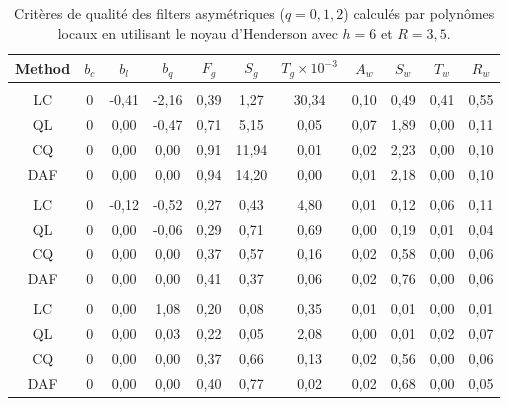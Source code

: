\documentclass[
  12pt,
  french,
  12pt,a4paper]{article}
\newcommand\1{\mathds{1}}
\begin{document}
\begin{table}[!h]

\caption{\label{tab:criteriaLp}Critères de qualité des filters asymétriques ($q=0,1,2$) calculés par polynômes locaux en utilisant le noyau d'Henderson avec $h=6$ et $R=3,5$.}
\centering
\begin{tabular}[t]{ccccccccccc}
\toprule
Method & $b_c$ & $b_l$ & $b_q$ & $F_g$ & $S_g$ & $T_g \times 10^{-3}$ & $A_w$ & $S_w$ & $T_w$ & $R_w$\\
\midrule
\addlinespace[0.3em]
\multicolumn{11}{l}{\textbf{$q=0$}}\\
\hspace{1em}LC & 0 & -0,41 & -2,16 & 0,39 & 1,27 & 30,34 & 0,10 & 0,49 & 0,41 & 0,55\\
\hspace{1em}QL & 0 & 0,00 & -0,47 & 0,71 & 5,15 & 0,05 & 0,07 & 1,89 & 0,00 & 0,11\\
\hspace{1em}CQ & 0 & 0,00 & 0,00 & 0,91 & 11,94 & 0,01 & 0,02 & 2,23 & 0,00 & 0,10\\
\hspace{1em}DAF & 0 & 0,00 & 0,00 & 0,94 & 14,20 & 0,00 & 0,01 & 2,18 & 0,00 & 0,10\\
\addlinespace[0.3em]
\multicolumn{11}{l}{\textbf{$q=1$}}\\
\hspace{1em}LC & 0 & -0,12 & -0,52 & 0,27 & 0,43 & 4,80 & 0,01 & 0,12 & 0,06 & 0,11\\
\hspace{1em}QL & 0 & 0,00 & -0,06 & 0,29 & 0,71 & 0,69 & 0,00 & 0,19 & 0,01 & 0,04\\
\hspace{1em}CQ & 0 & 0,00 & 0,00 & 0,37 & 0,57 & 0,16 & 0,02 & 0,58 & 0,00 & 0,06\\
\hspace{1em}DAF & 0 & 0,00 & 0,00 & 0,41 & 0,37 & 0,06 & 0,02 & 0,76 & 0,00 & 0,06\\
\addlinespace[0.3em]
\multicolumn{11}{l}{\textbf{$q=2$}}\\
\hspace{1em}LC & 0 & 0,00 & 1,08 & 0,20 & 0,08 & 0,35 & 0,01 & 0,01 & 0,00 & 0,01\\
\hspace{1em}QL & 0 & 0,00 & 0,03 & 0,22 & 0,05 & 2,08 & 0,00 & 0,01 & 0,02 & 0,07\\
\hspace{1em}CQ & 0 & 0,00 & 0,00 & 0,37 & 0,66 & 0,13 & 0,02 & 0,56 & 0,00 & 0,06\\
\hspace{1em}DAF & 0 & 0,00 & 0,00 & 0,40 & 0,77 & 0,02 & 0,02 & 0,68 & 0,00 & 0,05\\
\bottomrule
\end{tabular}
\end{table}
\end{document}
